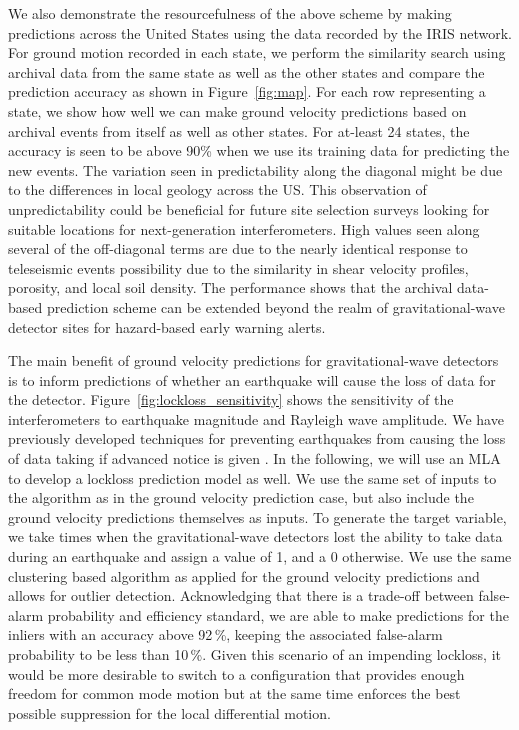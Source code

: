 \documentclass[reprint, prl, aps, showpacs]{revtex4-1}
\begin{document}
We also demonstrate the resourcefulness  of the above scheme by making predictions across the United States using the data recorded by the IRIS network. For ground motion recorded in each state, we perform the similarity search using archival data from the same state as well as the other states and compare the prediction accuracy as shown in Figure~\ref{fig:map}. For each row representing a state, we show how well we can make ground velocity predictions based on archival events from itself as well as other states. For at-least 24 states, the accuracy is seen to be above 90\% when we use its training data for predicting the new events. The variation seen in predictability along the diagonal might be due to the differences in local geology across the US. This observation of unpredictability could be beneficial for future site selection surveys looking for suitable locations for next-generation interferometers. High values seen along several of the off-diagonal terms are due to the nearly identical response to teleseismic events possibility due to the similarity in shear velocity profiles, porosity, and local soil density. The performance shows that the archival data-based prediction scheme can be extended beyond the realm of gravitational-wave detector sites for hazard-based early warning alerts.

The main benefit of ground velocity predictions for gravitational-wave detectors is to inform predictions of whether an earthquake will cause the loss of data for the detector. Figure~\ref{fig:lockloss_sensitivity} shows the sensitivity of the interferometers to earthquake magnitude and Rayleigh wave amplitude.
We have previously developed techniques for preventing earthquakes from causing the loss of data taking if advanced notice is given \cite{BiWa2018}.
In the following, we will use an MLA to develop a lockloss prediction model as well. 
We use the same set of inputs to the algorithm as in the ground velocity prediction case, but also include the ground velocity predictions themselves as inputs.
To generate the target variable, we take times when the gravitational-wave detectors lost the ability to take data during an earthquake and assign a value of 1, and a 0 otherwise. We use the same clustering based algorithm as applied for the ground velocity predictions and allows for outlier detection.
Acknowledging that there is a trade-off between false-alarm probability and efficiency standard, 
we are able to make predictions for the inliers with an accuracy above 92\,\%, keeping the associated false-alarm probability to be less than 10\,\%. Given this scenario of an impending lockloss, it would be more desirable to switch to a configuration that provides enough freedom for common mode motion but at the same time enforces the best possible suppression for the local differential motion.
\end{document}
